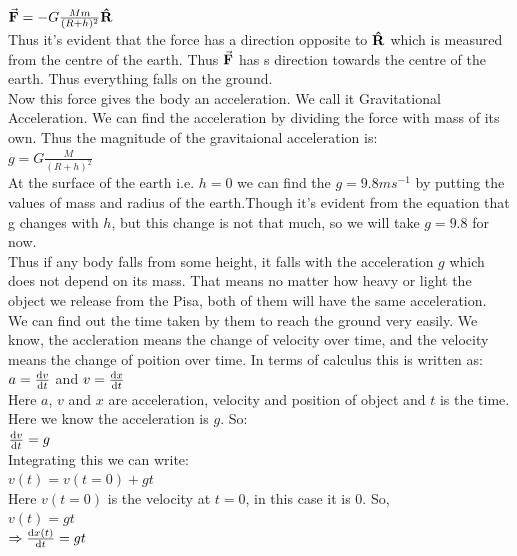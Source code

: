 \documentclass[24pt]{article}
\begin{document}
$\va{F}=- G \frac{M m}{(R+h)^2} \vu{R}$\\

Thus it's evident that the force has a direction opposite to $\vu{R}$ which is measured from the centre of the earth. Thus $\va{F}$ has s direction towards the centre of the earth. Thus everything falls on the ground.\\
Now this force gives the body an acceleration. We call it Gravitational Acceleration. We can find the acceleration by dividing the force with mass of its own. Thus the magnitude of the gravitaional acceleration is:\\
$g= G\frac{M}{(R+h)^2}$\\

At the surface of the earth i.e. $h=0$ we can find the $g= 9.8 ms^{-1}$ by putting the values of mass and radius of the earth.Though it's evident from the equation that g changes with $h$, but this change is not that much, so we will take $g=9.8$ for now.\\
Thus if any body falls from some height, it falls with the acceleration $g$ which does not depend on its mass. That means no matter how heavy or light the object  we release from the Pisa, both of them will have the same acceleration.\\
We can find out the time taken by them to reach the ground very easily. We know, the accleration means the change of velocity over time, and the velocity means the change of poition over time. In terms of calculus this is written as:\\

$a=\dv{v}{t}$ and $v=\dv{x}{t}$\\

Here $a$, $v$ and $x$ are acceleration, velocity and position of object and $t$ is the time.
Here we know the acceleration is $g$. So:\\

$\dv{v}{t}=g$\\

Integrating this we can write:\\

$v(t)=v(t=0)+gt$\\

Here $v(t=0)$ is the velocity at $t=0$, in this case it is 0. So,\\

$v(t)=gt$\\

$\Rightarrow \dv{x(t)}{t}=gt$\\
\end{document}

